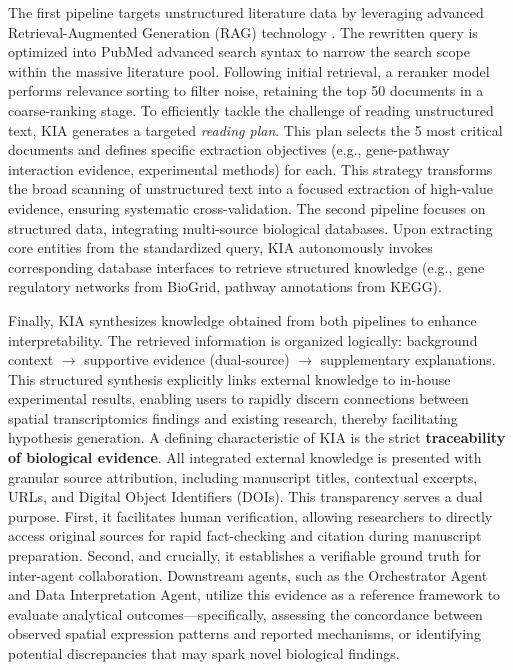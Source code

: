 \documentclass[a4,center,fleqn]{NAR}
\begin{document}
The first pipeline targets unstructured literature data by leveraging advanced Retrieval-Augmented Generation (RAG) technology \cite{lewis2020retrieval}. The rewritten query is optimized into PubMed advanced search syntax to narrow the search scope within the massive literature pool. Following initial retrieval, a reranker model performs relevance sorting to filter noise, retaining the top 50 documents in a coarse-ranking stage. To efficiently tackle the challenge of reading unstructured text, KIA generates a targeted \textit{reading plan}. This plan selects the 5 most critical documents and defines specific extraction objectives (e.g., gene-pathway interaction evidence, experimental methods) for each. This strategy transforms the broad scanning of unstructured text into a focused extraction of high-value evidence, ensuring systematic cross-validation.
The second pipeline focuses on structured data, integrating multi-source biological databases. Upon extracting core entities from the standardized query, KIA autonomously invokes corresponding database interfaces to retrieve structured knowledge (e.g., gene regulatory networks from BioGrid, pathway annotations from KEGG). 

Finally, KIA synthesizes knowledge obtained from both pipelines to enhance interpretability. The retrieved information is organized logically: background context $\rightarrow$ supportive evidence (dual-source) $\rightarrow$ supplementary explanations. This structured synthesis explicitly links external knowledge to in-house experimental results, enabling users to rapidly discern connections between spatial transcriptomics findings and existing research, thereby facilitating hypothesis generation.
A defining characteristic of KIA is the strict \textbf{traceability of biological evidence}. All integrated external knowledge is presented with granular source attribution, including manuscript titles, contextual excerpts, URLs, and Digital Object Identifiers (DOIs). This transparency serves a dual purpose. First, it facilitates human verification, allowing researchers to directly access original sources for rapid fact-checking and citation during manuscript preparation. Second, and crucially, it establishes a verifiable ground truth for inter-agent collaboration. Downstream agents, such as the Orchestrator Agent and Data Interpretation Agent, utilize this evidence as a reference framework to evaluate analytical outcomes—specifically, assessing the concordance between observed spatial expression patterns and reported mechanisms, or identifying potential discrepancies that may spark novel biological findings.
\end{document}

